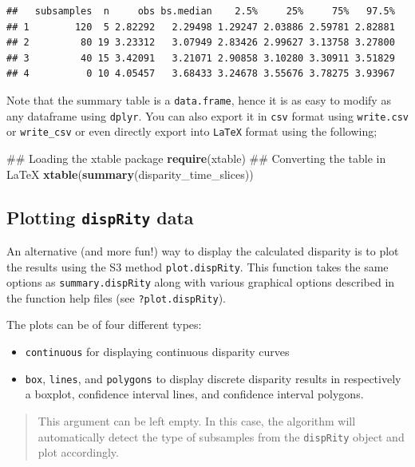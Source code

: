 \documentclass[]{book}
\newenvironment{Shaded}{\begin{snugshade}}{\end{snugshade}}
\newcommand{\KeywordTok}[1]{\textcolor[rgb]{0.13,0.29,0.53}{\textbf{#1}}}
\newcommand{\NormalTok}[1]{#1}
\providecommand{\tightlist}{%
  \setlength{\itemsep}{0pt}\setlength{\parskip}{0pt}}
\theoremstyle{definition}
\theoremstyle{definition}
\theoremstyle{remark}
\begin{document}
\begin{verbatim}
##   subsamples  n     obs bs.median    2.5%     25%     75%   97.5%
## 1        120  5 2.82292   2.29498 1.29247 2.03886 2.59781 2.82881
## 2         80 19 3.23312   3.07949 2.83426 2.99627 3.13758 3.27800
## 3         40 15 3.42091   3.21071 2.90858 3.10280 3.30911 3.51829
## 4          0 10 4.05457   3.68433 3.24678 3.55676 3.78275 3.93967
\end{verbatim}

Note that the summary table is a \texttt{data.frame}, hence it is as
easy to modify as any dataframe using \texttt{dplyr}. You can also
export it in \texttt{csv} format using \texttt{write.csv} or
\texttt{write\_csv} or even directly export into \texttt{LaTeX} format
using the following;

\begin{Shaded}
\begin{Highlighting}[]
\NormalTok{## Loading the xtable package}
\KeywordTok{require}\NormalTok{(xtable)}
\NormalTok{## Converting the table in LaTeX}
\KeywordTok{xtable}\NormalTok{(}\KeywordTok{summary}\NormalTok{(disparity_time_slices))}
\end{Highlighting}
\end{Shaded}

\subsection{\texorpdfstring{Plotting \texttt{dispRity}
data}{Plotting dispRity data}}\label{plotting-disprity-data}

An alternative (and more fun!) way to display the calculated disparity
is to plot the results using the S3 method \texttt{plot.dispRity}. This
function takes the same options as \texttt{summary.dispRity} along with
various graphical options described in the function help files (see
\texttt{?plot.dispRity}).

The plots can be of four different types:

\begin{itemize}
\tightlist
\item
  \texttt{continuous} for displaying continuous disparity curves
\item
  \texttt{box}, \texttt{lines}, and \texttt{polygons} to display
  discrete disparity results in respectively a boxplot, confidence
  interval lines, and confidence interval polygons.
\end{itemize}

\begin{quote}
This argument can be left empty. In this case, the algorithm will
automatically detect the type of subsamples from the \texttt{dispRity}
object and plot accordingly.
\end{quote}
\end{document}

